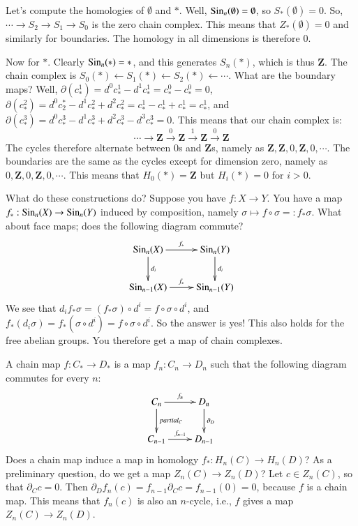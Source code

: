 Let's compute the homologies of $\emptyset$ and $\ast$. Well, $\mathrm{Sin}_n(\emptyset)=\emptyset$, so $S_\ast(\emptyset)=0$. So, $\cdots\to S_2\to S_1\to S_0$ is the zero chain complex. This means that $Z_\ast(\emptyset)=0$ and similarly for boundaries. The homology in all dimensions is therefore $0$.

Now for $\ast$. Clearly $\mathrm{Sin}_n(\ast)=\ast$, and this generates $S_n(\ast)$, which is thus $\mathbf{Z}$. The chain complex is $S_0(\ast)\leftarrow S_1(\ast)\leftarrow S_2(\ast)\leftarrow\cdots$. What are the boundary maps? Well, $\partial(c^1_\ast)=d^0c^1_\ast - d^1c^1_\ast = c^0_\ast - c^0_\ast = 0$, $\partial(c^2_\ast)=d^0c_2^\ast - d^1 c^2_\ast + d^2 c^2_\ast = c^1_\ast - c^1_\ast + c^1_\ast = c^1_\ast$, and $\partial (c^3_\ast)=d^0 c^3_\ast - d^1 c^3_\ast + d^2 c^3_\ast - d^3 c^3_\ast = 0$. This means that our chain complex is:
$$\cdots\to\mathbf{Z}\xrightarrow{0}\mathbf{Z}\xrightarrow{1}\mathbf{Z}\xrightarrow{0}\mathbf{Z}$$
The cycles therefore alternate between $0$s and $\mathbf{Z}$s, namely as $\mathbf{Z},\mathbf{Z},0,\mathbf{Z},0,\cdots$. The boundaries are the same as the cycles except for dimension zero, namely as $0,\mathbf{Z},0,\mathbf{Z},0,\cdots$. This means that $ H_0(\ast)=\mathbf{Z}$ but $ H_i(\ast)=0$ for $i>0$.

What do these constructions do? Suppose you have $f:X\to Y$. You have a map $f_\ast:\mathrm{Sin}_n(X)\to\mathrm{Sin}_n(Y)$ induced by composition, namely $\sigma\mapsto f\circ \sigma=:f_\ast\sigma$. What about face maps; does the following diagram commute?
\begin{eqnarray*}
\xymatrix{\Sin_n(X)\ar[r]^{f_\ast}\ar[d]^{d_i} & \Sin_n(Y)\ar[d]^{d_i}\\
\Sin_{n-1}(X)\ar[r]^{f_\ast} & \Sin_{n-1}(Y)}
\end{eqnarray*}
We see that $d_if_\ast\sigma=(f_\ast\sigma)\circ d^i=f\circ\sigma\circ d^i$, and $f_\ast(d_i\sigma)=f_\ast(\sigma\circ d^i)=f\circ\sigma\circ d^i$. So the answer is yes! This also holds for the free abelian groups. You therefore get a map of chain complexes.

A chain map $f:C_\ast\to D_\ast$ is a map $f_n:C_n\to D_n$ such that the following diagram commutes for every $n$:
\begin{equation*}
    \xymatrix{
	C_n\ar[r]^{f_n}\ar[d]^{partial_C} & D_n\ar[d]^{\partial_D}\\
	C_{n-1}\ar[r]^{f_{n-1}} & D_{n-1}
    }
\end{equation*}
Does a chain map induce a map in homology $f_\ast: H_n(C)\to H_n(D)$? As a preliminary question, do we get a map $Z_n(C)\to Z_n(D)$? Let $c\in Z_n(C)$, so that $\partial_C c = 0$. Then $\partial_D f_n(c) = f_{n-1}\partial_C c = f_{n-1}(0) = 0$, because $f$ is a chain map. This means that $f_n(c)$ is also an $n$-cycle, i.e., $f$ gives a map $Z_n(C)\to Z_n(D)$.

